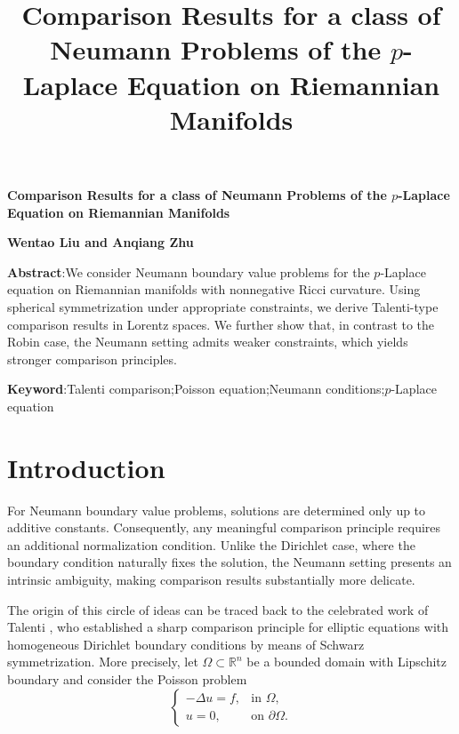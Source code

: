 \documentclass[11pt]{article}
\numberwithin{equation}{section}
\theoremstyle{definition}
\theoremstyle{remark}
\begin{document}
\noindent
\title{Comparison Results for a class of Neumann Problems of the $p$-Laplace Equation on Riemannian Manifolds}
{\Large \textbf{Comparison Results for a class of Neumann Problems of the $p$-Laplace Equation on Riemannian Manifolds}}\vspace{1\baselineskip}\par\noindent
{\large \textbf{Wentao Liu and Anqiang Zhu} }
\vspace{1\baselineskip}\par
\noindent
{\large \textbf{Abstract}}:We consider Neumann boundary value problems for the $p$-Laplace equation on Riemannian manifolds with nonnegative Ricci curvature. 
Using spherical symmetrization under appropriate constraints, we derive Talenti-type comparison results in Lorentz spaces.
We further show that, in contrast to the Robin case, the Neumann setting admits weaker constraints, which yields stronger comparison principles.
\vspace{0.5\baselineskip}\par\noindent
{\large \textbf{Keyword}}:Talenti comparison;Poisson equation;Neumann conditions;$p$-Laplace equation
\section{Introduction}
\par\noindent
For Neumann boundary value problems, 
solutions are determined only up to additive constants. 
Consequently, any meaningful comparison principle requires an additional normalization condition. 
Unlike the Dirichlet case, where the boundary condition naturally fixes the solution, 
the Neumann setting presents an intrinsic ambiguity, making comparison results substantially more delicate.

The origin of this circle of ideas can be traced back to the celebrated work of Talenti \cite{talenti1976elliptic}, 
who established a sharp comparison principle for elliptic equations with homogeneous Dirichlet boundary conditions by means of Schwarz symmetrization. 
More precisely, let $\Omega\subset\mathbb{R}^n$ be a bounded domain with Lipschitz boundary and consider the Poisson problem
\begin{equation}
\begin{cases}
-\Delta u=f,
& \text{in }\Omega,
\\
u=0,
& \text{on }\partial\Omega.
\end{cases}
\end{equation}
\end{document}
